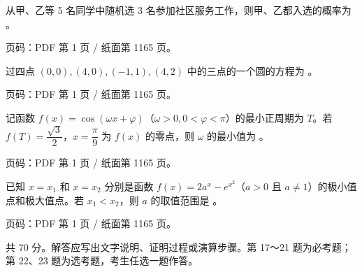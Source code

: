 \begin{question}
从甲、乙等 5 名同学中随机选 3 名参加社区服务工作，则甲、乙都入选的概率为 \gkblank{}。

\begin{gktip}
页码：PDF 第 1 页 / 纸面第 1165 页。
\end{gktip}

\end{question}
\begin{question}
过四点 $(0,0),(4,0),(-1,1),(4,2)$ 中的三点的一个圆的方程为 \gkblank{}。

\begin{gktip}
页码：PDF 第 1 页 / 纸面第 1165 页。
\end{gktip}

\end{question}
\begin{question}
记函数 $f(x)=\cos(\omega x+\varphi)$（$\omega>0,0<\varphi<\pi$）的最小正周期为 $T$。若 $f(T)=\dfrac{\sqrt3}{2}$，$x=\dfrac\pi9$ 为 $f(x)$ 的零点，则 $\omega$ 的最小值为 \gkblank{}。

\begin{gktip}
页码：PDF 第 1 页 / 纸面第 1165 页。
\end{gktip}

\end{question}
\begin{question}
已知 $x=x_1$ 和 $x=x_2$ 分别是函数 $f(x)=2a^x-e^{x^2}$（$a>0$ 且 $a\ne1$）的极小值点和极大值点。若 $x_1<x_2$，则 $a$ 的取值范围是 \gkblank{}。

\begin{gktip}
页码：PDF 第 1 页 / 纸面第 1165 页。
\end{gktip}

\end{question}

\begin{gktip}
共 70 分。解答应写出文字说明、证明过程或演算步骤。第 17～21 题为必考题；第 22、23 题为选考题，考生任选一题作答。
\end{gktip}


